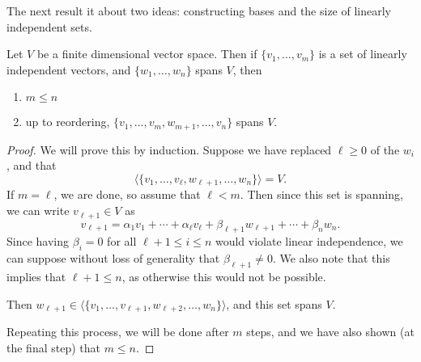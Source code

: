 \documentclass[a4paper]{scrartcl}
\begin{document}
The next result it about two ideas: constructing bases and the size of linearly independent sets. 

\begin{theorem}
    Let $V$ be a finite dimensional vector space. Then if $\{v_1, \dots, v_m\}$ is a set of linearly independent vectors, and $\{w_1, \dots, w_n\}$ spans $V$, then
    \begin{enumerate}[label=(\roman*)]
        \item $m \leq n$
        \item up to reordering, $\{v_1, \dots, v_m, w_{m + 1}, \dots, v_n\}$ spans $V$.
    \end{enumerate}
\end{theorem}
\begin{proof}
    We will prove this by induction. Suppose we have replaced $\ell \geq 0$ of the $w_i$, and that
    $$
    \langle \{ v_1, \dots, v_\ell, w_{\ell + 1}, \dots, w_n\}\rangle = V.
    $$
    If $m = \ell$, we are done, so assume that $\ell < m$. Then since this set is spanning, we can write $v_{\ell + 1} \in V$ as
    $$
    v_{\ell+1} = \alpha_1 v_1 + \cdots + \alpha_{\ell} v_{\ell} + \beta_{\ell + 1} w_{\ell + 1} + \cdots + \beta_n w_n.
    $$ 
    Since having $\beta_i = 0$ for all $\ell + 1 \leq i \leq n$ would violate linear independence, we can suppose without loss of generality that $\beta_{\ell + 1} \neq 0$. We also note that this implies that $\ell + 1 \leq n$, as otherwise this would not be possible.

    Then $w_{\ell + 1} \in \langle \{v_1, \dots, v_{\ell + 1}, w_{\ell + 2}, \dots, w_{n} \} \rangle$, and this set spans $V$.

    Repeating this process, we will be done after $m$ steps, and we have also shown (at the final step) that $m \leq n$.
\end{proof}
\end{document}
